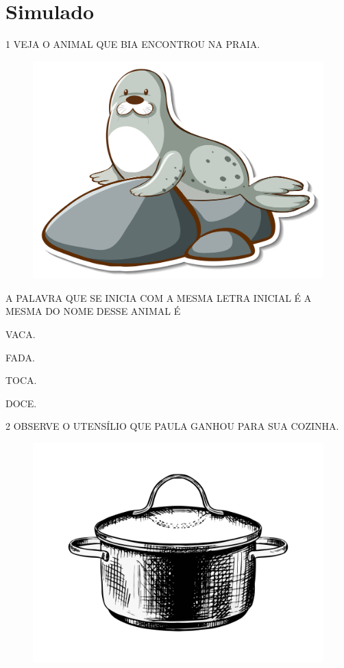 \setcounter{chapter}{0}
\chapter[Simulado 1]{Simulado}

\vspace*{-1cm}

\num{1} VEJA O ANIMAL QUE BIA ENCONTROU NA PRAIA.

\begin{figure}[H]
\centering
\includegraphics[width=.5\textwidth]{./media/image210.jpg}
\end{figure}

A PALAVRA QUE SE INICIA COM A MESMA LETRA INICIAL É A MESMA DO NOME DESSE ANIMAL É

\begin{multicols}{2}
\begin{escolha}
\item VACA.

\item FADA.

\item TOCA.

\item DOCE.
\end{escolha}
\end{multicols}

\num{2} OBSERVE O UTENSÍLIO QUE PAULA GANHOU PARA SUA COZINHA.
\enlargethispage{2\baselineskip}

\begin{figure}[H]
\centering
\includegraphics[width=.5\textwidth]{./media/image211.jpg}
\end{figure}

